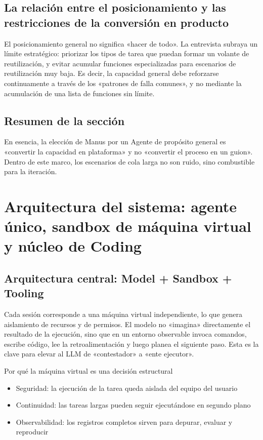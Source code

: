 \documentclass[a4paper]{article}
\begin{document}
\subsection{La relación entre el posicionamiento y las restricciones de la conversión en producto}

El posicionamiento general no significa «hacer de todo». La entrevista subraya un límite estratégico: priorizar los tipos de tarea que puedan formar un volante de reutilización, y evitar acumular funciones especializadas para escenarios de reutilización muy baja. Es decir, la capacidad general debe reforzarse continuamente a través de los «patrones de falla comunes», y no mediante la acumulación de una lista de funciones sin límite.

\subsection{Resumen de la sección}

En esencia, la elección de Manus por un Agente de propósito general es «convertir la capacidad en plataforma» y no «convertir el proceso en un guion». Dentro de este marco, los escenarios de cola larga no son ruido, sino combustible para la iteración.
\section{Arquitectura del sistema: agente único, sandbox de máquina virtual y núcleo de Coding}

\subsection{Arquitectura central: Model + Sandbox + Tooling}

Cada sesión corresponde a una máquina virtual independiente, lo que genera aislamiento de recursos y de permisos. El modelo no «imagina» directamente el resultado de la ejecución, sino que en un entorno observable invoca comandos, escribe código, lee la retroalimentación y luego planea el siguiente paso. Esta es la clave para elevar al LLM de «contestador» a «ente ejecutor».

\begin{importantbox}{Por qué la máquina virtual es una decisión estructural}
\begin{itemize}
    \item Seguridad: la ejecución de la tarea queda aislada del equipo del usuario
    \item Continuidad: las tareas largas pueden seguir ejecutándose en segundo plano
    \item Observabilidad: los registros completos sirven para depurar, evaluar y reproducir
\end{itemize}
\end{importantbox}
\end{document}
